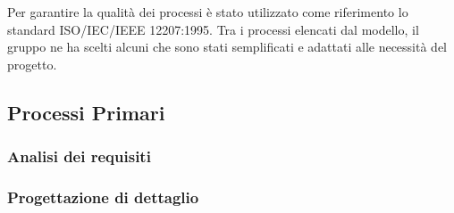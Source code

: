 
Per garantire la qualità dei processi è stato utilizzato come riferimento lo standard ISO/IEC/IEEE 12207:1995. Tra i processi elencati dal modello, il gruppo ne ha scelti alcuni che sono stati semplificati e adattati alle necessità del progetto.

\subsection{Processi Primari}
\subsubsection{Analisi dei requisiti}

\subsubsection{Progettazione di dettaglio}